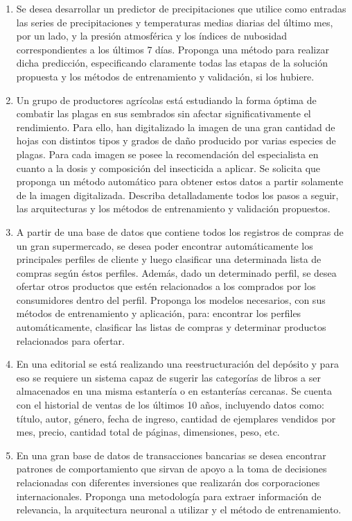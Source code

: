 \documentclass[a4paper,10pt,spanish,oneside]{article}
\begin{document}
\begin{enumerate}
\item Se desea desarrollar un predictor de precipitaciones que utilice como entradas las series de precipitaciones y temperaturas medias diarias del último mes, por un lado, y la presión atmosférica y los índices de nubosidad correspondientes a los últimos 7 días. Proponga una método para realizar dicha predicción, especificando claramente todas las etapas de la solución propuesta y los métodos de entrenamiento y validación, si los hubiere.

\item Un grupo de productores agrícolas está estudiando la forma óptima de combatir las plagas en sus sembrados sin afectar significativamente el rendimiento. Para ello, han digitalizado la imagen de una gran cantidad de hojas con distintos tipos y grados de daño producido por varias especies de plagas. Para cada imagen se posee la recomendación del especialista en cuanto a la dosis y composición del insecticida a aplicar. Se solicita que proponga un método automático para obtener estos datos a partir solamente de la imagen digitalizada. Describa detalladamente todos los pasos a seguir, las arquitecturas y los métodos de entrenamiento y validación propuestos.

\item A partir de una base de datos que contiene todos los registros de compras de un gran supermercado, se desea poder encontrar automáticamente los principales perfiles de cliente y luego clasificar una determinada lista de compras según éstos perfiles. Además, dado un determinado perfil, se desea ofertar otros productos que estén relacionados a los comprados por los consumidores dentro del perfil. Proponga los modelos necesarios, con sus métodos de entrenamiento y aplicación, para: encontrar los perfiles automáticamente, clasificar las listas de compras y determinar productos relacionados para ofertar.

\item En una editorial se está realizando una reestructuración del depósito y para eso se requiere un sistema capaz de sugerir las categorías de libros a ser almacenados en una misma estantería o en estanterías cercanas. Se cuenta con el historial de ventas de los últimos 10 años, incluyendo datos como: título, autor, género, fecha de ingreso, cantidad de ejemplares vendidos por mes, precio, cantidad total de páginas, dimensiones, peso, etc.

\item En una gran base de datos de transacciones bancarias se desea encontrar patrones de comportamiento que sirvan de apoyo a la toma de decisiones relacionadas con diferentes inversiones que realizarán dos corporaciones internacionales. Proponga una metodología para extraer información de relevancia, la arquitectura neuronal a utilizar y el método de entrenamiento.


\end{enumerate}
\end{document}
